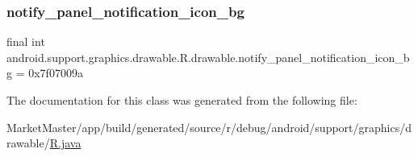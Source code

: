 \subsubsection{\texorpdfstring{notify\+\_\+panel\+\_\+notification\+\_\+icon\+\_\+bg}{notify\_panel\_notification\_icon\_bg}}
{\footnotesize\ttfamily final int android.\+support.\+graphics.\+drawable.\+R.\+drawable.\+notify\+\_\+panel\+\_\+notification\+\_\+icon\+\_\+bg = 0x7f07009a\hspace{0.3cm}{\ttfamily [static]}}



The documentation for this class was generated from the following file\+:\begin{DoxyCompactItemize}
\item 
Market\+Master/app/build/generated/source/r/debug/android/support/graphics/drawable/\mbox{\hyperlink{debug_2android_2support_2graphics_2drawable_2R_8java}{R.\+java}}\end{DoxyCompactItemize}
